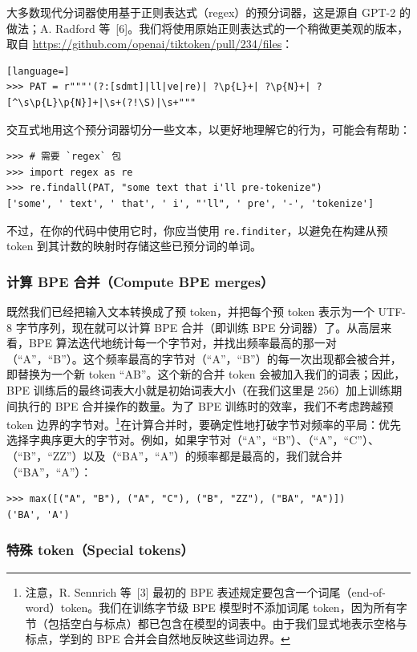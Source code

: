 大多数现代分词器使用基于正则表达式（regex）的预分词器，这是源自 GPT-2 的做法；A. Radford 等 \,[6]。我们将使用原始正则表达式的一个稍微更美观的版本，取自 \url{https://github.com/openai/tiktoken/pull/234/files}：

\begin{lstlisting}[language=]
>>> PAT = r"""'(?:[sdmt]|ll|ve|re)| ?\p{L}+| ?\p{N}+| ?[^\s\p{L}\p{N}]+|\s+(?!\S)|\s+"""
\end{lstlisting}

交互式地用这个预分词器切分一些文本，以更好地理解它的行为，可能会有帮助：

\begin{lstlisting}
>>> # 需要 `regex` 包
>>> import regex as re
>>> re.findall(PAT, "some text that i'll pre-tokenize")
['some', ' text', ' that', ' i', "'ll", ' pre', '-', 'tokenize']
\end{lstlisting}

不过，在你的代码中使用它时，你应当使用 \texttt{re.finditer}，以避免在构建从预 token 到其计数的映射时存储这些已预分词的单词。

\subsubsection*{计算 BPE 合并（Compute BPE merges）}

既然我们已经把输入文本转换成了预 token，并把每个预 token 表示为一个 UTF-8 字节序列，现在就可以计算 BPE 合并（即训练 BPE 分词器）了。从高层来看，BPE 算法迭代地统计每一个字节对，并找出频率最高的那一对（“A”，“B”）。这个频率最高的字节对（“A”，“B”）的每一次出现都会被合并，即替换为一个新 token “AB”。这个新的合并 token 会被加入我们的词表；因此，BPE 训练后的最终词表大小就是初始词表大小（在我们这里是 256）加上训练期间执行的 BPE 合并操作的数量。为了 BPE 训练时的效率，我们不考虑跨越预 token 边界的字节对。\footnote{注意，R. Sennrich 等 \,[3] 最初的 BPE 表述规定要包含一个词尾（end-of-word）token。我们在训练字节级 BPE 模型时不添加词尾 token，因为所有字节（包括空白与标点）都已包含在模型的词表中。由于我们显式地表示空格与标点，学到的 BPE 合并会自然地反映这些词边界。}在计算合并时，要确定性地打破字节对频率的平局：优先选择字典序更大的字节对。例如，如果字节对（“A”，“B”）、（“A”，“C”）、（“B”，“ZZ”）以及（“BA”，“A”）的频率都是最高的，我们就合并（“BA”，“A”）：

\begin{lstlisting}
>>> max([("A", "B"), ("A", "C"), ("B", "ZZ"), ("BA", "A")])
('BA', 'A')
\end{lstlisting}

\subsubsection*{特殊 token（Special tokens）}

